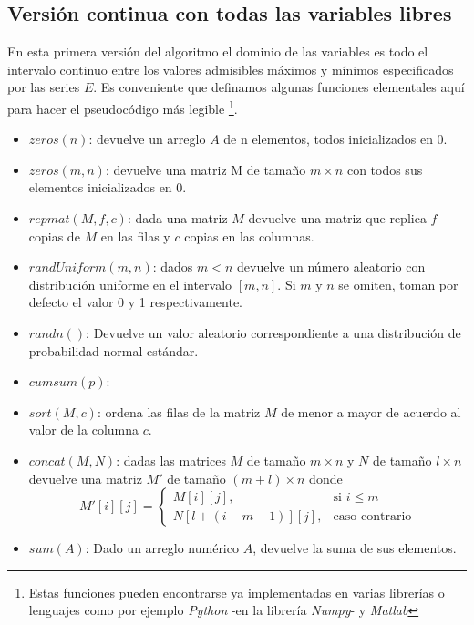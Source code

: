 \documentclass{llncs}
\begin{document}
	
	
	\subsection{Versión continua con todas las variables libres}
	\label{subsec:VersionContinua}
	En esta primera versión del algoritmo el dominio de las variables es todo el intervalo continuo entre los valores
	admisibles máximos y mínimos especificados por las series $E$. Es conveniente que definamos algunas funciones 
	elementales aquí para hacer el pseudocódigo más 
	legible \footnote{Estas funciones pueden encontrarse ya implementadas en varias librerías o lenguajes como 
	por ejemplo \textit{Python} -en la librería \textit{Numpy}- y \textit{Matlab}}. 

	\begin{itemize}
		\item $zeros(n)$: devuelve un arreglo $A$ de n elementos, todos inicializados en 0.
		\item $zeros (m, n)$: devuelve una matriz M de tamaño $m \times n$ con todos sus elementos inicializados en 0.
		\item $repmat(M, f, c)$: dada una matriz $M$ devuelve una matriz que replica $f$ copias de $M$ en las filas y $c$ copias en las
		columnas.
		\item $randUniform(m, n)$: dados $m < n$ devuelve un número aleatorio con distribución uniforme en el intervalo
		 $[m,n]$. Si $m$ y $n$ se omiten, toman por defecto el valor 0 y 1 respectivamente. 
		\item $randn()$: Devuelve un valor aleatorio correspondiente a una distribución de probabilidad normal estándar.
		\item $cumsum(p)$:
		\item $sort(M, c)$: ordena las filas de la matriz $M$ de menor a mayor de acuerdo al valor de la columna $c$.
		\item $concat(M,N)$: dadas las matrices $M$ de tamaño $m \times n$ y $N$ de tamaño $l \times n$ devuelve una matriz $M'$
		de tamaño $(m+l) \times n$ donde
		\begin{equation*}
		M'[i][j] =
		\begin{cases}
		M[i][j],& \text{si } i \leq m\\
		N[l+(i-m-1)][j],              & \text{caso contrario}
		\end{cases}
		\end{equation*}
		\item $sum(A)$: Dado un arreglo numérico $A$, devuelve la suma de sus elementos. 
	\end{itemize}
	
\end{document}
